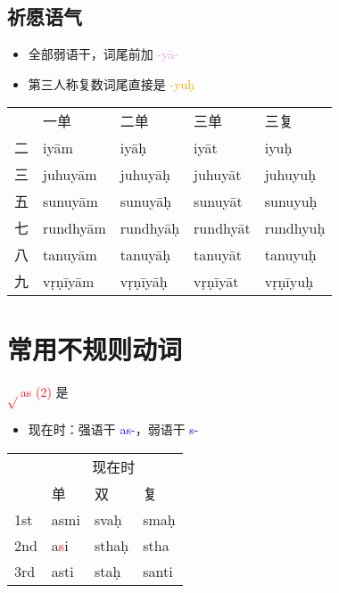\documentclass[17pt]{beamer}
\newcommand{\verbroot}[1]{\textcolor{red}{$\sqrt{}$#1}}
\newcommand{\verbstem}[1]{\textcolor{blue}{#1\nobreakdash-}}
\newcommand{\wordending}[1]{\textcolor{Orange}{\nobreakdash-#1}}
\newcommand{\fullpada}[1]{\textcolor{OliveGreen}{#1}}
\newcommand{\pratyaya}[1]{\textcolor{Plum}{#1}}
\begin{document}
\subsection{祈愿语气}
\begin{frame}{\insertsubsection}
  \small
  \begin{itemize}
    \item 全部弱语干，词尾前加 \pratyaya{\nobreakdash-yā-}
    \item 第三人称复数词尾直接是 \wordending{yuḥ}
  \end{itemize}
  \centering
  \begin{tabular}{@{}lllll@{}} %
    & 一单  & 二单 & 三单 & 三复 \\
    二 & \fullpada{iyām} & \fullpada{iyāḥ} & \fullpada{iyāt}  & \fullpada{iyuḥ}  \\
    三 & \fullpada{juhuyām} & \fullpada{juhuyāḥ} & \fullpada{juhuyāt} & \fullpada{juhuyuḥ}  \\
    五 & \fullpada{sunuyām} & \fullpada{sunuyāḥ} & \fullpada{sunuyāt} & \fullpada{sunuyuḥ}  \\
    七 & \fullpada{rundhyām} & \fullpada{rundhyāḥ} & \fullpada{rundhyāt} & \fullpada{rundhyuḥ}  \\
    八 & \fullpada{tanuyām} & \fullpada{tanuyāḥ} & \fullpada{tanuyāt} & \fullpada{tanuyuḥ}  \\
    九 & \fullpada{vṛṇīyām} & \fullpada{vṛṇīyāḥ} & \fullpada{vṛṇīyāt} & \fullpada{vṛṇīyuḥ}  \\
  \end{tabular}   
\end{frame}


\section{常用不规则动词}
\begin{frame}{\insertsection }
    \tableofcontents[currentsection]
\end{frame}

\begin{frame}{\verbroot{as (2)} 是}
  %\small
  \begin{itemize}
    \item 现在时：强语干 \verbstem{as}，弱语干 \verbstem{s}
  \end{itemize}
  \centering
  \begin{tabular}{@{}llll@{}} %
    &   \multicolumn{3}{c}{现在时}  \\
    & 单  & 双 & 复 \\
    1st & \cellcolor{light-gray}\fullpada{asmi} & \fullpada{svaḥ} & \fullpada{smaḥ}  \\
    2nd & \cellcolor{light-gray}\fullpada{a\textcolor{red}{s}i} & \fullpada{sthaḥ} & \fullpada{stha} \\
    3rd & \cellcolor{light-gray}\fullpada{asti} & \fullpada{staḥ} & \fullpada{santi} \\
  \end{tabular}   
\end{frame}
\end{document}
